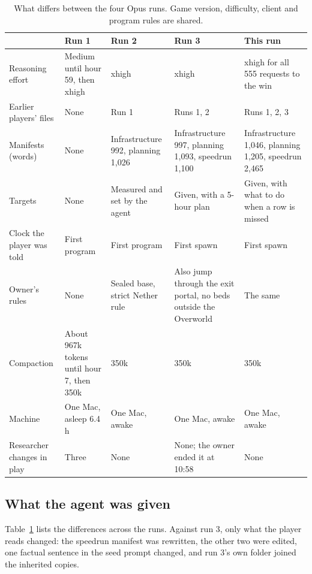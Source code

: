 \documentclass[11pt,a4paper]{article}
\begin{document}
\begin{table}[t]
  \caption{What differs between the four Opus runs. Game version, difficulty, client and program rules are shared.}
  \label{tab:setup}
  \footnotesize
  \begin{tabularx}{\textwidth}{@{}>{\raggedright\arraybackslash}p{2.1cm}>{\raggedright\arraybackslash}X>{\raggedright\arraybackslash}X>{\raggedright\arraybackslash}X>{\raggedright\arraybackslash}X@{}}
    \toprule
    & \textbf{Run 1} & \textbf{Run 2} & \textbf{Run 3} & \textbf{This run} \\
    \midrule
    Reasoning effort & Medium until hour 59, then xhigh & xhigh & xhigh & xhigh for all 555 requests to the win \\
    Earlier players' files & None & Run 1 & Runs 1, 2 & Runs 1, 2, 3 \\
    Manifests (words) & None & Infrastructure 992, planning 1,026 & Infrastructure 997, planning 1,093, speedrun 1,100 & Infrastructure 1,046, planning 1,205, speedrun 2,465 \\
    Targets & None & Measured and set by the agent & Given, with a 5-hour plan & Given, with what to do when a row is missed \\
    Clock the player was told & First program & First program & First spawn & First spawn \\
    Owner's rules & None & Sealed base, strict Nether rule & Also jump through the exit portal, no beds outside the Overworld & The same \\
    Compaction & About 967k tokens until hour 7, then 350k & 350k & 350k & 350k \\
    Machine & One Mac, asleep 6.4 h & One Mac, awake & One Mac, awake & One Mac, awake \\
    Researcher changes in play & Three & None & None; the owner ended it at 10:58 & None \\
    \bottomrule
  \end{tabularx}
\end{table}

\subsection{What the agent was given}

Table~\ref{tab:setup} lists the differences across the runs. Against run 3, only what the player reads changed: the speedrun manifest was rewritten, the other two were edited, one factual sentence in the seed prompt changed, and run 3's own folder joined the inherited copies.
\end{document}
